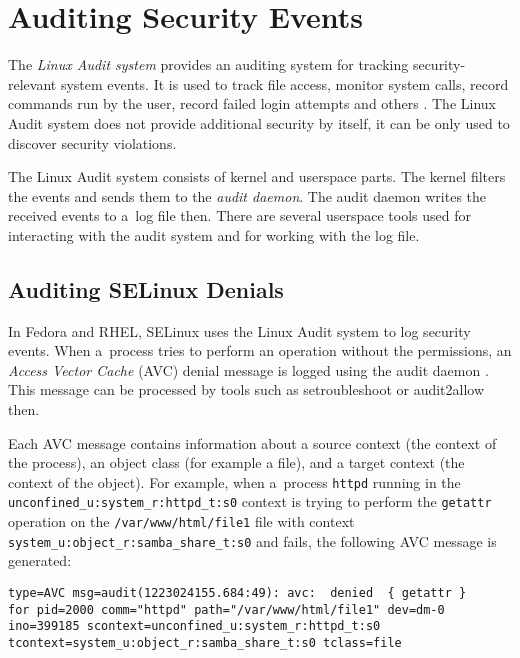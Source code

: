 \section{Auditing Security Events}

The \emph{Linux Audit system} provides an auditing system for tracking
security-relevant system events. It is used to track file access, monitor system
calls, record commands run by the user, record failed login attempts and others
\cite{secguide}. The Linux Audit system does not provide additional security by
itself, it can be only used to discover security violations.

The Linux Audit system consists of kernel and userspace parts. The kernel
filters the events and sends them to the \emph{audit daemon}. The audit daemon
writes the received events to a~log file then. There are several userspace tools
used for interacting with the audit system and for working with the log file.

\subsection{Auditing SELinux Denials}

In Fedora and RHEL, SELinux uses the Linux Audit system to log security events.
When a~process tries to perform an operation without the permissions, an
\emph{Access Vector Cache} (AVC) denial message is logged using the audit daemon
\cite{selinuxguide}. This message can be processed by tools such as
setroubleshoot or audit2allow then.

Each AVC message contains information about a source context (the context of the
process), an object class (for example a file), and a target context (the
context of the object). For example, when a~process \texttt{httpd} running in
the \texttt{unconfined\_u:system\_r:httpd\_t:s0} context is trying to perform
the \texttt{getattr} operation on the \texttt{/var/www/html/file1} file with
context \texttt{system\_u:object\_r:samba\_share\_t:s0} and fails, the following
AVC message is generated:

\begin{lstlisting}
type=AVC msg=audit(1223024155.684:49): avc:  denied  { getattr }
for pid=2000 comm="httpd" path="/var/www/html/file1" dev=dm-0
ino=399185 scontext=unconfined_u:system_r:httpd_t:s0
tcontext=system_u:object_r:samba_share_t:s0 tclass=file
\end{lstlisting}

